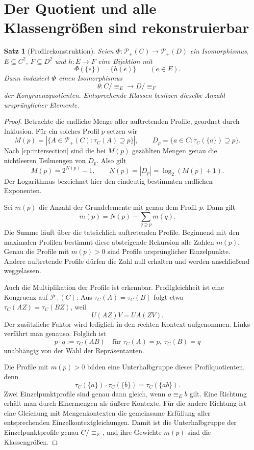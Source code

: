 \documentclass[a4paper,11pt]{article}
\newcommand{\Pp}[1]{\mathcal P_+(#1)}
\newtheorem{satz}{Satz}
\begin{document}
\section{Der Quotient und alle Klassengrößen sind rekonstruierbar}

\begin{satz}[Profilrekonstruktion]\label{cp:profiles}
Seien \(\Phi:\Pp C\to\Pp D\) ein Isomorphismus,
\(E\subseteq C^2\), \(F\subseteq D^2\) und \(h:E\to F\)
eine Bijektion mit
\[
 \Phi(\{e\})=\{h(e)\}\qquad(e\in E).
\]
Dann induziert \(\Phi\) einen Isomorphismus
\[
 \theta:C/{\equiv_E}\longrightarrow D/{\equiv_F}
\]
der Kongruenzquotienten. Entsprechende Klassen besitzen dieselbe
Anzahl ursprünglicher Elemente.
\end{satz}

\begin{proof}
Betrachte die endliche Menge aller auftretenden Profile, geordnet
durch Inklusion. Für ein solches Profil \(p\) setzen wir
\[
 M(p)=|\{A\in\Pp C:\tau_C(A)\supseteq p\}|,\qquad
 D_p=\{a\in C:\tau_C(\{a\})\supseteq p\}.
\]
Nach \eqref{cp:intersection} sind die bei \(M(p)\) gezählten Mengen
genau die nichtleeren Teilmengen von \(D_p\). Also gilt
\begin{equation}\label{cp:count}
 M(p)=2^{N(p)}-1,\qquad N(p)=|D_p|=\log_2(M(p)+1).
\end{equation}
Der Logarithmus bezeichnet hier den eindeutig bestimmten endlichen
Exponenten.

Sei \(m(p)\) die Anzahl der Grundelemente mit genau dem Profil \(p\).
Dann gilt
\begin{equation}\label{cp:mobius}
 m(p)=N(p)-\sum_{q\supsetneq p}m(q).
\end{equation}
Die Summe läuft über die tatsächlich auftretenden Profile. Beginnend
mit den maximalen Profilen bestimmt diese absteigende Rekursion alle
Zahlen \(m(p)\). Genau die Profile mit \(m(p)>0\) sind Profile
ursprünglicher Einzelpunkte. Andere auftretende Profile dürfen die
Zahl null erhalten und werden anschließend weggelassen.

Auch die Multiplikation der Profile ist erkennbar. Profilgleichheit
ist eine Kongruenz auf \(\Pp C\): Aus
\(\tau_C(A)=\tau_C(B)\) folgt etwa
\(\tau_C(AZ)=\tau_C(BZ)\), weil
\[
 U(AZ)V=UA(ZV).
\]
Der zusätzliche Faktor wird lediglich in den rechten Kontext
aufgenommen. Links verfährt man genauso. Folglich ist
\[
 p\cdot q:=\tau_C(AB)
 \quad\text{für }\tau_C(A)=p,\ \tau_C(B)=q
\]
unabhängig von der Wahl der Repräsentanten.

Die Profile mit \(m(p)>0\) bilden eine Unterhalbgruppe dieses
Profilquotienten, denn
\[
 \tau_C(\{a\})\cdot\tau_C(\{b\})=\tau_C(\{ab\}).
\]
Zwei Einzelpunktprofile sind genau dann gleich, wenn
\(a\equiv_E b\) gilt. Eine Richtung erhält man durch Einermengen
als äußere Kontexte. Für die andere Richtung ist eine Gleichung mit
Mengenkontexten die gemeinsame Erfüllung aller entsprechenden
Einzelkontextgleichungen. Damit ist die Unterhalbgruppe der
Einzelpunktprofile genau \(C/{\equiv_E}\), und ihre Gewichte \(m(p)\)
sind die Klassengrößen.


\end{proof}
\end{document}
